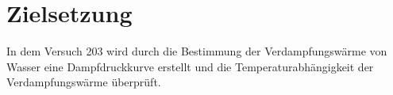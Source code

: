 \section{Zielsetzung} 

\begin{flushleft}
    In dem Versuch 203 wird durch die Bestimmung der Verdampfungswärme von Wasser eine Dampfdruckkurve erstellt und die Temperaturabhängigkeit der Verdampfungswärme überprüft.
\end{flushleft}